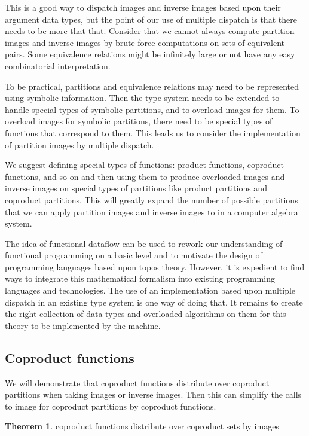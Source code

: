 \documentclass[a4paper,11pt, notitlepage]{report}
\theoremstyle{definition}
\newtheorem{theorem}{Theorem}[section]
\begin{document}
This is a good way to dispatch images and inverse images based upon their argument data types, but the point of our use of multiple dispatch is that there needs to be more that that. Consider that we cannot always compute partition images and inverse images by brute force computations on sets of equivalent pairs. Some equivalence relations might be infinitely large or not have any easy combinatorial interpretation.

To be practical, partitions and equivalence relations may need to be represented using symbolic information. Then the type system needs to be extended to handle special types of symbolic partitions, and to overload images for them. To overload images for symbolic partitions, there need to be special types of functions that correspond to them. This leads us to consider the implementation of partition images by multiple dispatch.

We suggest defining special types of functions: product functions, coproduct functions, and so on and then using them to produce overloaded images and inverse images on special types of partitions like product partitions and coproduct partitions. This will greatly expand the number of possible partitions that we can apply partition images and inverse images to in a computer algebra system.

The idea of functional dataflow can be used to rework our understanding of functional programming on a basic level and to motivate the design of programming languages based upon topos theory. However, it is expedient to find ways to integrate this mathematical formalism into existing programming languages and technologies. The use of an implementation based upon multiple dispatch in an existing type system is one way of doing that. It remains to create the right collection of data types and overloaded algorithms on them for this theory to be implemented by the machine.

\subsection{Coproduct functions}
We will demonstrate that coproduct functions distribute over coproduct partitions when taking images or inverse images. Then this can simplify the calls to image for coproduct partitions by coproduct functions.

\begin{theorem} coproduct functions distribute over coproduct sets by images\end{theorem}
\end{document}
